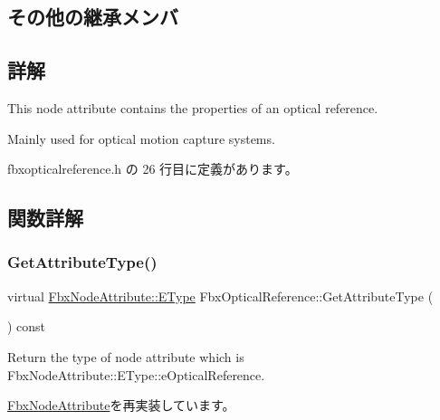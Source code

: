 \subsection*{その他の継承メンバ}


\subsection{詳解}
This node attribute contains the properties of an optical reference.

Mainly used for optical motion capture systems. 

 fbxopticalreference.\+h の 26 行目に定義があります。



\subsection{関数詳解}
\mbox{\label{class_fbx_optical_reference_ac2c1840cbfffb236bd3b9fe49d797e12}} 
\subsubsection{\texorpdfstring{Get\+Attribute\+Type()}{GetAttributeType()}}
{\footnotesize\ttfamily virtual \hyperlink{class_fbx_node_attribute_a08e1669d3d1a696910756ab17de56d6a}{Fbx\+Node\+Attribute\+::\+E\+Type} Fbx\+Optical\+Reference\+::\+Get\+Attribute\+Type (\begin{DoxyParamCaption}{ }\end{DoxyParamCaption}) const\hspace{0.3cm}{\ttfamily [virtual]}}



Return the type of node attribute which is Fbx\+Node\+Attribute\+::\+E\+Type\+::e\+Optical\+Reference. 



\hyperlink{class_fbx_node_attribute_a1c2116756906127145a2b8721fc26752}{Fbx\+Node\+Attribute}を再実装しています。

\mbox{\label{class_fbx_optical_reference_ad45da7e49810bea40ff29fdaf0ca9b0b}} 
